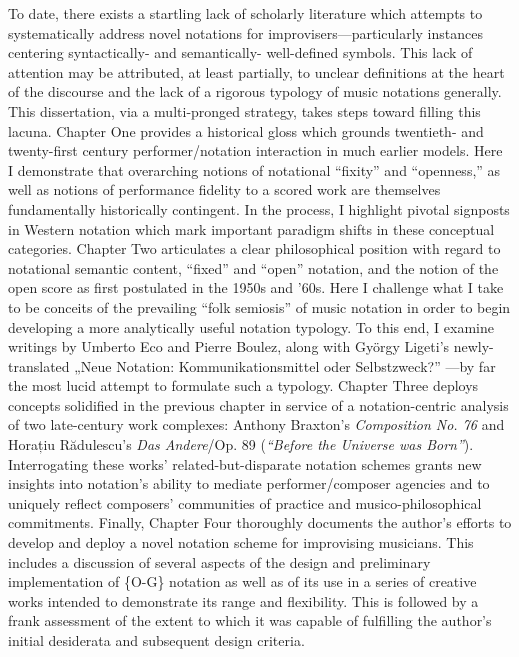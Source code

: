 {
To date, there exists a startling lack of scholarly literature which attempts to systematically address novel notations for improvisers---particularly instances centering syntactically- and semantically- well-defined symbols. This lack of attention may be attributed, at least partially, to unclear definitions at the heart of the discourse and the lack of a rigorous typology of music notations generally. This dissertation, via a multi-pronged strategy, takes steps toward filling this lacuna. Chapter One provides a historical gloss which grounds twentieth- and twenty-first century performer/notation interaction in much earlier models. Here I demonstrate that overarching notions of notational ``fixity'' and ``openness,'' as well as notions of performance fidelity to a scored work are themselves fundamentally historically contingent. In the process, I highlight pivotal signposts in Western notation which mark important paradigm shifts in these conceptual categories. Chapter Two articulates a clear philosophical position with regard to notational semantic content, ``fixed'' and ``open'' notation, and the notion of the open score as first postulated in the 1950s and '60s. Here I challenge what I take to be conceits of the prevailing ``folk semiosis'' of music notation in order to begin developing a more analytically useful notation typology. To this end, I examine writings by Umberto Eco and Pierre Boulez, along with Gy\"{o}rgy Ligeti's newly-translated „Neue Notation: Kommunikationsmittel oder Selbstzweck?”
---by far the most lucid attempt to formulate such a typology. Chapter Three deploys concepts solidified in the previous chapter in service of a notation-centric analysis of two late-century work complexes: Anthony Braxton's \textit{Composition No. 76} and Horațiu Rădulescu's \textit{Das Andere}/Op. 89 (\textit{``Before the Universe was Born''}). Interrogating these works' related-but-disparate notation schemes grants new insights into notation's ability to mediate performer/composer agencies and to uniquely reflect composers' communities of practice and musico-philosophical commitments. Finally, Chapter Four thoroughly documents the author's efforts to develop and deploy a novel notation scheme for improvising musicians. This includes a discussion of several aspects of the design and preliminary implementation of \{O-G\} notation as well as of its use in a series of creative works intended to demonstrate its range and flexibility. This is followed by a frank assessment of the extent to which it was capable of fulfilling the author's initial desiderata and subsequent design criteria.
}


